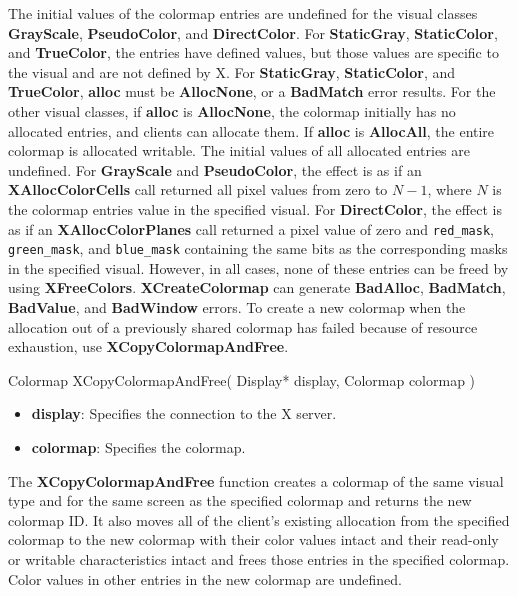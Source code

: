\documentclass{report}
\begin{document}
\begin{itemize}
            \bigbreak \noindent
            The initial values of the colormap entries are undefined for the visual classes \textbf{GrayScale}, \textbf{PseudoColor}, and \textbf{DirectColor}. For \textbf{StaticGray}, \textbf{StaticColor}, and \textbf{TrueColor}, the entries have defined values, but those values are specific to the visual and are not defined by X. For \textbf{StaticGray}, \textbf{StaticColor}, and \textbf{TrueColor}, \textbf{alloc} must be \textbf{AllocNone}, or a \textbf{BadMatch} error results. For the other visual classes, if \textbf{alloc} is \textbf{AllocNone}, the colormap initially has no allocated entries, and clients can allocate them. 
            \bigbreak \noindent
            If \textbf{alloc} is \textbf{AllocAll}, the entire colormap is allocated writable. The initial values of all allocated entries are undefined. For \textbf{GrayScale} and \textbf{PseudoColor}, the effect is as if an \textbf{XAllocColorCells} call returned all pixel values from zero to $N - 1$, where $N$ is the colormap entries value in the specified visual. For \textbf{DirectColor}, the effect is as if an \textbf{XAllocColorPlanes} call returned a pixel value of zero and \texttt{red\_mask}, \texttt{green\_mask}, and \texttt{blue\_mask} containing the same bits as the corresponding masks in the specified visual. However, in all cases, none of these entries can be freed by using \textbf{XFreeColors}.
            \bigbreak \noindent
            \textbf{XCreateColormap} can generate \textbf{BadAlloc}, \textbf{BadMatch}, \textbf{BadValue}, and \textbf{BadWindow} errors.
            \bigbreak \noindent
            To create a new colormap when the allocation out of a previously shared colormap has failed because of resource exhaustion, use \textbf{XCopyColormapAndFree}.
            \bigbreak \noindent
            \begin{cppcode}
                Colormap XCopyColormapAndFree(
                    Display* display,
                    Colormap colormap
                )
            \end{cppcode}
            \bigbreak \noindent
            \begin{itemize}
                \item \textbf{display}: Specifies the connection to the X server.
                \item \textbf{colormap}: Specifies the colormap.
            \end{itemize}
            \bigbreak \noindent
            The \textbf{XCopyColormapAndFree} function creates a colormap of the same visual type and for the same screen as the specified colormap and returns the new colormap ID. It also moves all of the client's existing allocation from the specified colormap to the new colormap with their color values intact and their read-only or writable characteristics intact and frees those entries in the specified colormap. Color values in other entries in the new colormap are undefined.

\end{itemize}
\end{document}
